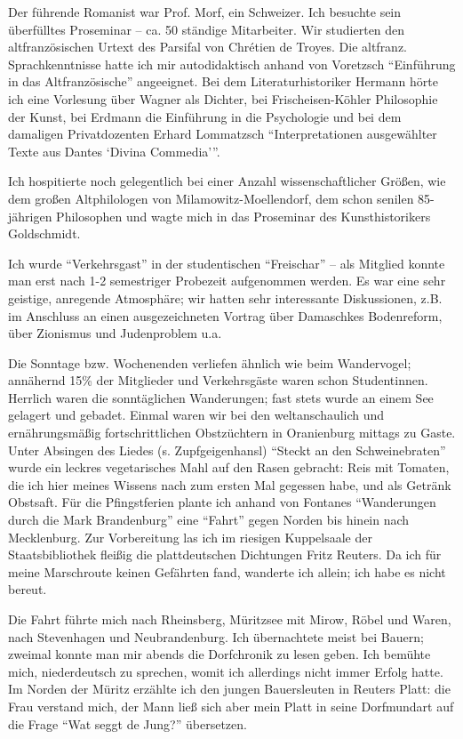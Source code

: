 \documentclass[a5paper,pagesize,10pt,twoside=true]{scrbook}
\begin{document}
Der führende Romanist war Prof. Morf, ein Schweizer. Ich besuchte sein überfülltes Proseminar -- ca. 50 ständige Mitarbeiter. Wir studierten den altfranzösischen Urtext des Parsifal von Chrétien de Troyes. Die altfranz. Sprachkenntnisse hatte ich mir autodidaktisch anhand von Voretzsch \enquote{Einführung in das Altfranzösische} angeeignet. Bei dem Literaturhistoriker Hermann hörte ich eine Vorlesung über Wagner als Dichter, bei Frischeisen-Köhler Philosophie der Kunst, bei Erdmann die Einführung in die Psychologie und bei dem damaligen Privatdozenten Erhard Lommatzsch \enquote{Interpretationen ausgewählter Texte aus Dantes \enquote{Divina Commedia}}.

Ich hospitierte noch gelegentlich bei einer Anzahl wissenschaftlicher Größen, wie dem großen Altphilologen von Milamowitz-Moellendorf, dem schon senilen 85-jährigen Philosophen und wagte mich in das Proseminar des Kunsthistorikers Goldschmidt.

Ich wurde \enquote{Verkehrsgast} in der studentischen \enquote{Freischar} -- als Mitglied konnte man erst nach 1-2 semestriger Probezeit aufgenommen werden. Es war eine sehr geistige, anregende Atmosphäre; wir hatten sehr interessante Diskussionen, z.B. im Anschluss an einen ausgezeichneten Vortrag über Damaschkes Bodenreform, über Zionismus und Judenproblem u.a.

Die Sonntage bzw. Wochenenden verliefen ähnlich wie beim Wandervogel; annähernd 15\% der Mitglieder und Verkehrsgäste waren schon Studentinnen. Herrlich waren die sonntäglichen Wanderungen; fast stets wurde an einem See gelagert und gebadet. Einmal waren wir bei den weltanschaulich und ernährungsmäßig fortschrittlichen Obstzüchtern in Oranienburg mittags zu Gaste. Unter Absingen des Liedes (s. Zupfgeigenhansl) \enquote{Steckt an den Schweinebraten} wurde ein leckres vegetarisches Mahl auf den Rasen gebracht: Reis mit Tomaten, die ich hier meines Wissens nach zum ersten Mal gegessen habe, und als Getränk Obstsaft. Für die Pfingstferien plante ich anhand von Fontanes \enquote{Wanderungen durch die Mark Brandenburg} eine \enquote{Fahrt} gegen Norden bis hinein nach Mecklenburg. Zur Vorbereitung las ich im riesigen Kuppelsaale der Staatsbibliothek fleißig die plattdeutschen Dichtungen Fritz Reuters. Da ich für meine Marschroute keinen Gefährten fand, wanderte ich allein; ich habe es nicht bereut.

Die Fahrt führte mich nach Rheinsberg, Müritzsee mit Mirow, Röbel und Waren, nach Stevenhagen und Neubrandenburg. Ich übernachtete meist bei Bauern; zweimal konnte man mir abends die Dorfchronik zu lesen geben.
Ich bemühte mich, niederdeutsch zu sprechen, womit ich allerdings nicht immer Erfolg hatte. Im Norden der Müritz erzählte ich den jungen Bauersleuten in Reuters Platt: die Frau verstand mich, der Mann ließ sich aber mein Platt in seine Dorfmundart auf die Frage \enquote{Wat seggt de Jung?} übersetzen.
\end{document}

